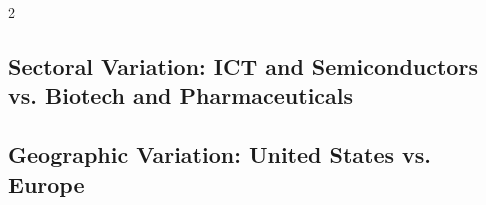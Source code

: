 \documentclass[12pt]{article}
\begin{document}
\begin{spacing}{2}
\subsection{Sectoral Variation: ICT and Semiconductors vs. Biotech and Pharmaceuticals}

\subsection{Geographic Variation: United States vs. Europe}

\FloatBarrier


\end{spacing}
\end{document}
